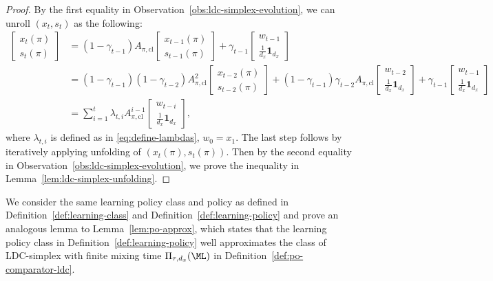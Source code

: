 \begin{proof}
By the first equality in Observation~\ref{obs:ldc-simplex-evolution}, we can unroll $(x_t,s_t)$ as the following:
\begin{align*}
\begin{bmatrix}
x_{t}(\pi) \\
s_{t}(\pi)
\end{bmatrix}
&=(1-\gamma_{t-1})A_{\pi,\mathrm{cl}}\begin{bmatrix}
x_{t-1}(\pi)\\
s_{t-1}(\pi)
\end{bmatrix}+\gamma_{t-1} \begin{bmatrix}
w_{t-1}\\
\frac{1}{d_x}\mathbf{1}_{d_x}
\end{bmatrix}\\
&=(1-\gamma_{t-1})(1-\gamma_{t-2})A_{\pi,\mathrm{cl}}^2\begin{bmatrix}
x_{t-2}(\pi)\\
s_{t-2}(\pi)
\end{bmatrix}+(1-\gamma_{t-1})\gamma_{t-2} A_{\pi, \mathrm{cl}}\begin{bmatrix}
w_{t-2}\\
\frac{1}{d_x}\mathbf{1}_{d_x}
\end{bmatrix}+\gamma_{t-1} \begin{bmatrix}
w_{t-1}\\
\frac{1}{d_x}\mathbf{1}_{d_x}
\end{bmatrix}\\
&=\sum_{i=1}^{t} \lambda_{t,i}A_{\pi,\mathrm{cl}}^{i-1}\begin{bmatrix}
w_{t-i}\\
\frac{1}{d_x}\mathbf{1}_{d_x}
\end{bmatrix},
\end{align*}
where $\lambda_{t,i}$ is defined as in \cref{eq:define-lambdas}, $w_0=x_1$. The last step follows by iteratively applying unfolding of $(x_t(\pi), s_t(\pi))$. Then by the second equality in Observation~\ref{obs:ldc-simplex-evolution}, we prove the inequality in Lemma~\ref{lem:ldc-simplex-unfolding}. 
\end{proof}

We consider the same learning policy class and policy as defined in Definition~\ref{def:learning-class} and Definition~\ref{def:learning-policy} and prove an analogous lemma to Lemma~\ref{lem:po-approx}, which states that the learning policy class in Definition~\ref{def:learning-policy} well approximates the class of LDC-simplex with finite mixing time $\Pi_{\tau, d_x}(\ML)$ in Definition~\ref{def:po-comparator-ldc}.


